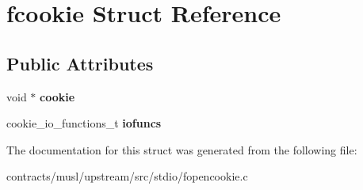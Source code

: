 \hypertarget{structfcookie}{}\section{fcookie Struct Reference}
\label{structfcookie}
\subsection*{Public Attributes}
\begin{DoxyCompactItemize}
\item 
\mbox{\label{structfcookie_ac7d53dfca4b56345f33b553f9293ac5d}} 
void $\ast$ {\bfseries cookie}
\item 
\mbox{\label{structfcookie_a230d767121e346d62f9e6a88fe1518bd}} 
cookie\+\_\+io\+\_\+functions\+\_\+t {\bfseries iofuncs}
\end{DoxyCompactItemize}


The documentation for this struct was generated from the following file\+:\begin{DoxyCompactItemize}
\item 
contracts/musl/upstream/src/stdio/fopencookie.\+c\end{DoxyCompactItemize}
